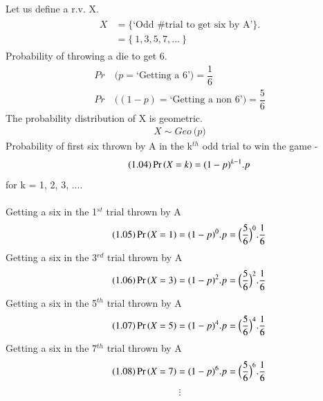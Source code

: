\documentclass[journal,12pt,twocolumn]{IEEEtran}
\begin{document}
\subsection*{}
Let us define a r.v. X.
\begin{align}\tag{1.01}
    \begin{split}
        X &= \{\text{`Odd \# trial to get six by A'}\}.\\
          &= \{\ 1, 3, 5, 7, ...\ \}
    \end{split}
\end{align}
Probability of throwing a die to get 6.
\begin{equation}\tag{1.02}
\begin{split}
    Pr\ & \Big(p=\text{`Getting a 6'}\Big) = \dfrac{1}{6}\\
    Pr\ & \Big((1-p)=\text{`Getting a non 6'}\Big) = \dfrac{5}{6}
\end{split}
\end{equation}
The probability distribution of X is geometric.
\begin{align}\tag{1.03}
    X \sim Geo\ \Big(p\Big)
\end{align}
Probability of first six thrown by A in the k$^{th}$ odd trial to win the game - 
\begin{align}\tag{1.04}
    \Pr\left(X = k\right) = (1-p)^{k-1}.p
\end{align}
for k = 1, 2, 3, ....\\
\\
Getting a six in the 1$^{st}$ trial thrown by A
\begin{align}\tag{1.05}
    \Pr\left(X = 1\right) = (1-p)^{0}.p = \Big(\dfrac{5}{6}\Big)^{0}.\dfrac{1}{6}
\end{align}
Getting a six in the 3$^{rd}$ trial thrown by A
\begin{align}\tag{1.06}
    \Pr\left(X = 3\right) = (1-p)^{2}.p = \Big(\dfrac{5}{6}\Big)^{2}.\dfrac{1}{6}
\end{align}
Getting a six in the 5$^{th}$ trial thrown by A 
\begin{align}\tag{1.07}
    \Pr\left(X = 5\right) = (1-p)^{4}.p = \Big(\dfrac{5}{6}\Big)^{4}.\dfrac{1}{6}
\end{align}
Getting a six in the 7$^{th}$ trial thrown by A 
\begin{align}\tag{1.08}
    \Pr\left(X = 7\right) = (1-p)^{6}.p = \Big(\dfrac{5}{6}\Big)^{6}.\dfrac{1}{6}
\end{align}
\begin{align*}
    \vdots
\end{align*}
\end{document}
